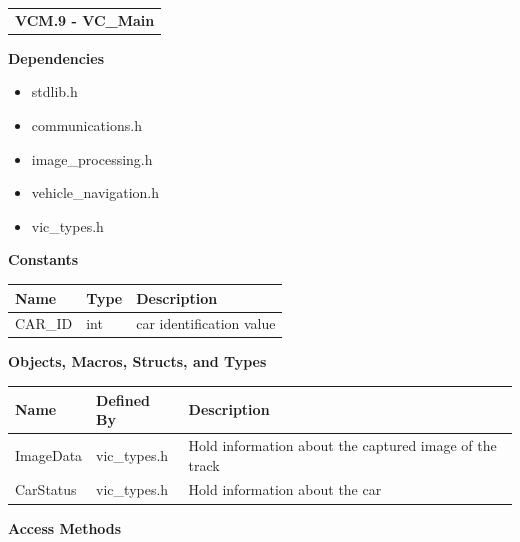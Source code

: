\documentclass [10pt]{article}
\begin{document}
\begin{longtable}{p{}}
\rowcolor{subsectionC}\textbf{VCM.9 - VC\_Main} \\
\end{longtable}




\textbf{Dependencies} 
\begin{itemize} 
\itemsep 0em 
\item stdlib.h
\item communications.h
\item image\_processing.h
\item vehicle\_navigation.h
\item vic\_types.h
\end{itemize}

\textbf{Constants}
\begin{longtable}{ p{ }  p{ } p{}} \\ 

\rowcolor{tableCell} \textbf{Name} & \textbf{Type} & \textbf{Description} \\ \hline
\rowcolor{tableCell} CAR\_ID & int & car identification value\\ \hline




\end{longtable}


\textbf{Objects, Macros, Structs, and Types}
\begin{longtable}{ p{ }  p{ } p{}} \\ 

\rowcolor{tableCell} \textbf{Name} & \textbf{Defined By} & \textbf{Description} \\ \hline

\rowcolor{tableCell} ImageData & vic\_types.h &  Hold  information about the captured image of the track \\ \hline
\rowcolor{tableCell} CarStatus & vic\_types.h & Hold information about the car  \\ \hline




\end{longtable}



\textbf{Access Methods} 
\end{document}
